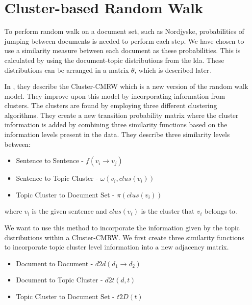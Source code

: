 \section{Cluster-based Random Walk}
To perform random walk on a document set, such as Nordjyske, probabilities of jumping between documents is needed to perform each step.
We have chosen to use a similarity measure between each document as these probabilities.
This is calculated by using the document-topic distributions from the \gls{lda}.
These distributions can be arranged in a matrix $\theta$, which is described later.

In \cite{ClusterPageRank}, they describe the \gls{Cluster-CMRW} which is a new version of the random walk model. 
They improve upon this model by incorporating information from clusters. 
The clusters are found by employing three different clustering algorithms.
They create a new transition probability matrix where the cluster information is added by combining three similarity functions based on the information levels present in the data.
They describe three similarity levels between:
\begin{itemize}
    \item Sentence to Sentence - $f(v_i \rightarrow v_j)$
    \item Sentence to Topic Cluster - $\omega(v_i, clus(v_i))$
    \item Topic Cluster to Document Set - $\pi(clus(v_i))$
\end{itemize}
where $v_i$ is the given sentence and $clus(v_i)$ is the cluster that $v_i$ belongs to.

We want to use this method to incorporate the information given by the topic distributions within a \gls{Cluster-CMRW}. 
We first create three similarity functions to incorporate topic cluster level information into a new adjacency matrix.
\begin{itemize}
    \item Document to Document - $d2d(d_1 \rightarrow d_2)$
    \item Document to Topic Cluster - $d2t(d,t)$
    \item Topic Cluster to Document Set - $t2D(t)$
\end{itemize}

